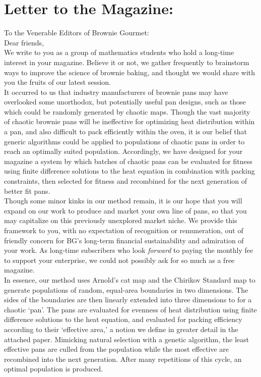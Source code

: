 \documentclass[12pt]{reedmcm}
\begin{document}
\newpage
\section{Letter to the Magazine:}
To the Venerable Editors of Brownie Gourmet:
\\
Dear friends,\\
We write to you as a group of mathematics students who hold a long-time interest in your magazine.  Believe it or not, we gather frequently to brainstorm ways to improve the science of brownie baking, and thought we would share with you the fruits of our latest session.\\
\indent It occurred to us that industry manufacturers of brownie pans may have overlooked some unorthodox, but potentially useful pan designs, such as those which could be randomly generated by chaotic maps.  Though the vast majority of chaotic brownie pans will be ineffective for optimizing heat distribution within a pan, and also difficult to pack efficiently within the oven, it is our belief that generic algorithms could be applied to populations of chaotic pans in order to reach an optimally suited population.  Accordingly, we have designed for your magazine a system by which batches of chaotic pans can be evaluated for fitness using finite difference solutions to the heat equation in combination with packing constraints, then selected for fitness and recombined for the next generation of better fit pans.  \\
\indent Though some minor kinks in our method remain, it is our hope that you will expand on our work to produce and market your own line of pans, so that you may capitalize on this previously unexplored market niche.  We provide this framework to you, with no expectation of recognition or remuneration, out of friendly concern for BG's long-term financial sustainability and admiration of your work.  As long-time subscribers who look \textit{forward} to paying the monthly fee to support your enterprise, we could not possibly ask for so much as a free magazine.\\
\indent In essence, our method uses Arnold's cat map and the Chirikov Standard map to generate populations of random, equal-area boundaries in two dimensions.  The sides of the boundaries are then linearly extended into three dimensions to for a chaotic `pan'.  The pans are evaluated for evenness of heat distribution using finite difference solutions to the heat equation, and evaluated for packing efficiency according to their `effective area,' a notion we define in greater detail in the attached paper.  Mimicking natural selection with a genetic algorithm, the least effective pans are culled from the population while the most effective are recombined into the next generation.  After many repetitions of this cycle, an optimal population is produced.\\
\end{document}
